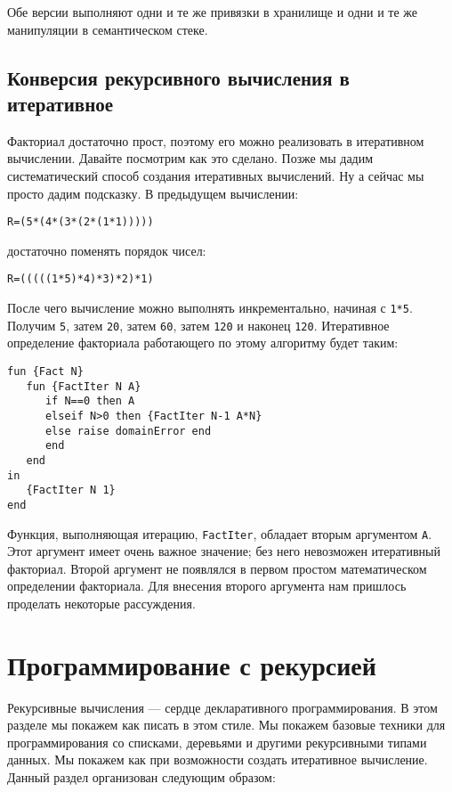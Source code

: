 Обе версии выполняют одни и те же привязки в хранилище и одни и те же манипуляции в семантическом стеке.

\subsection{Конверсия рекурсивного вычисления в итеративное}

Факториал достаточно прост, поэтому его можно реализовать в итеративном вычислении. Давайте посмотрим как это сделано. Позже мы дадим систематический способ создания итеративных вычислений. Ну а сейчас мы просто дадим подсказку. В предыдущем вычислении:

\begin{lstlisting}
R=(5*(4*(3*(2*(1*1)))))
\end{lstlisting}

достаточно поменять порядок чисел:

\begin{lstlisting}
R=(((((1*5)*4)*3)*2)*1)
\end{lstlisting}

После чего вычисление можно выполнять инкрементально, начиная с \lstinline!1*5!. Получим \lstinline!5!, затем \lstinline!20!, затем \lstinline!60!, затем \lstinline!120! и наконец \lstinline!120!. Итеративное определение факториала работающего по этому алгоритму будет таким:

\begin{lstlisting}
fun {Fact N}
   fun {FactIter N A}
      if N==0 then A
      elseif N>0 then {FactIter N-1 A*N}
      else raise domainError end
      end
   end
in
   {FactIter N 1}
end
\end{lstlisting}

Функция, выполняющая итерацию, \lstinline!FactIter!, обладает вторым аргументом \lstinline!A!. Этот аргумент имеет очень важное значение; без него невозможен итеративный факториал. Второй аргумент не появлялся в первом простом математическом определении факториала. Для внесения второго аргумента нам пришлось проделать некоторые рассуждения.

\section{Программирование с рекурсией}

Рекурсивные вычисления --- сердце декларативного программирования. В этом разделе мы покажем как писать в этом стиле. Мы покажем базовые техники для программирования со списками, деревьями и другими рекурсивными типами данных. Мы покажем как при возможности создать итеративное вычисление. Данный раздел организован следующим образом:

